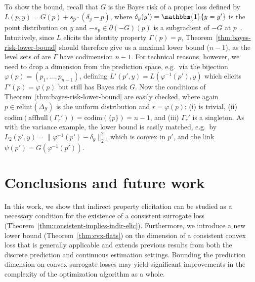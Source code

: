 \documentclass{article}
\newcommand{\simplex}{\Delta_\Y}
\newcommand{\relint}[1]{\mathrm{relint}(#1)}
\newcommand{\codim}{\mathrm{codim}}
\newcommand{\affhull}{\mathrm{affhull}}
\newcommand{\Y}{\mathcal{Y}}
\newcommand{\ones}{\mathbbm{1}}
\begin{document}
To show the bound, recall that $G$ is the Bayes risk of a proper loss defined by $L(p,y) = G(p) + s_p \cdot (\delta_y - p)$, where $\delta_y(y') = \ones\{y=y'\}$ is the point distribution on $y$ and $-s_p \in \partial (-G)(p)$ is a subgradient of $-G$ at $p$~\citep{gneiting2007strictly,reid2009surrogate,frongillo2014general}.
Intuitively, since $L$ elicits the identity property $\Gamma(p)=p$, Theorem~\ref{thm:bayes-risk-lower-bound} should therefore give us a maximal lower bound ($n-1$), as the level sets of are $\Gamma$ have codimension $n-1$.
For technical reasons, however, we need to drop a dimension from the prediction space, e.g.\ via the bijection $\varphi(p) = (p_1,\ldots,p_{n-1})$, defining $L'(p',y) = L(\varphi^{-1}(p'),y)$ which elicits $\Gamma'(p) = \varphi(p)$ but still has Bayes risk $G$.
Now the conditions of Theorem~\ref{thm:bayes-risk-lower-bound} are easily checked, where again $p\in\relint\simplex$ is the uniform distribution and $r=\varphi(p)$: (i) is trivial, (ii) $\codim(\affhull(\Gamma_r')) = \codim(\{p\}) = n-1$, and (iii) $\Gamma_r'$ is a singleton.
As with the variance example, the lower bound is easily matched, e.g.\ by $L_2(p',y) = \|\varphi^{-1}(p')-\delta_y\|_2^2$, which is convex in $p'$, and the link $\psi(p') = G(\varphi^{-1}(p'))$.


\section{Conclusions and future work}\label{sec:conclusions}
In this work, we show that indirect property elicitation can be studied as a necessary condition for the existence of a consistent surrogate loss (Theorem~\ref{thm:consistent-implies-indir-elic}).
Furthermore, we introduce a new lower bound (Theorem~\ref{thm:cvx-flats}) on the dimension of a consistent convex loss that is generally applicable and extends previous results from both the discrete prediction and continuous estimation settings.
Bounding the prediction dimension on convex surrogate losses may yield significant improvements in the complexity of the optimization algorithm as a whole.
\end{document}
